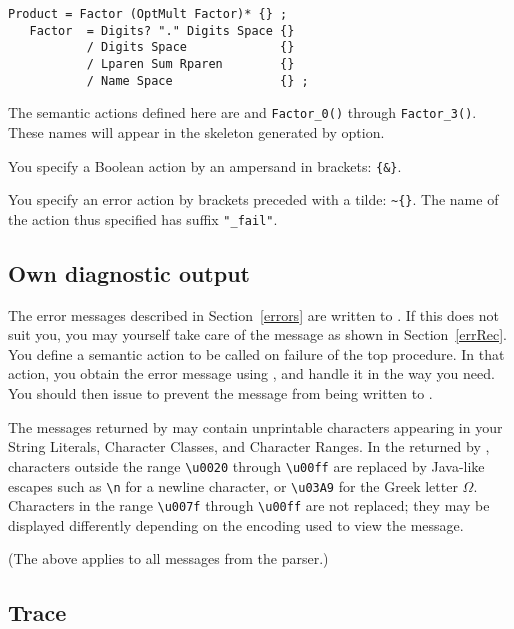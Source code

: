 \small
\begin{Verbatim}[frame=single,framesep=2mm,samepage=true,xleftmargin=15mm,xrightmargin=15mm,baselinestretch=0.8]
   Product = Factor (OptMult Factor)* {} ;
   Factor  = Digits? "." Digits Space {}
           / Digits Space             {}
           / Lparen Sum Rparen        {} 
           / Name Space               {} ; 
\end{Verbatim}
\normalsize

The semantic actions defined here are
 and \verb#Factor_0()# through \verb#Factor_3()#.
These names will appear in the skeleton generated by  option.

You specify a Boolean action by an ampersand in brackets: \verb#{&}#.

You specify an error action by brackets preceded with a tilde: \verb#~{}#.\newline
The name of the action thus specified has suffix \verb#"_fail"#.


\subsection{Own diagnostic output}

The error messages described in Section~\ref{errors}
are written to .
If this does not suit you, you may yourself take care of the message
as shown in Section~\ref{errRec}.
You define a semantic action to be called on failure of the top procedure.
In that action, you obtain the error message using ,
and handle it in the way you need.
You should then issue  to prevent the message from
being written to .

The messages returned by  may contain unprintable
characters appearing in your String Literals, Character Classes, and Character Ranges.
In the  returned by ,
characters outside the range \verb#\u0020# through \verb#\u00ff#
are replaced by Java-like
escapes such as \verb#\n# for a newline character, 
or \verb#\u03A9# for the Greek letter $\Omega$.
Characters in the range \verb#\u007f# through \verb#\u00ff# are not replaced;
they may be displayed differently depending on the encoding used to view the message.

(The above applies to all messages from the parser.)


\subsection{Trace}

